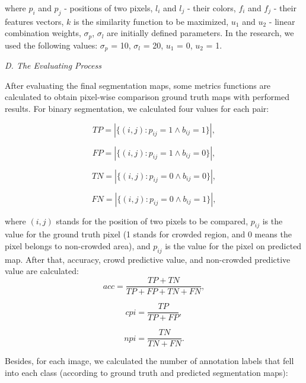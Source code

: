 \documentclass{article}
\begin{document}
\begin{multicols}{2}
where $p_i$ and $p_j$ - positions of two pixels, $l_i$ and $l_j$ - their colors, $f_i$ and $f_j$ - their features vectors, $k$ is the similarity function to be maximized, $u_1$ and $u_2$ - linear combination weights, $\sigma_p$, $\sigma_l$ are initially defined parameters. In the research, we used the following values: $\sigma_p$ = 10, $\sigma_l$ = 20, $u_1$ = 0, $u_2$ = 1.

\par
\vspace{3mm}
\textit {D. The Evaluating Process}
\par
\vspace{2mm}
After evaluating the final segmentation maps, some metrics functions are calculated to obtain pixel-wise comparison ground truth maps with performed results. For binary segmentation, we calculated four values for each pair:

\begin{equation}
    TP = |\{(i, j) : p_{ij} = 1 \wedge b_{ij} = 1\}|,
\end{equation}

\begin{equation}
    FP = |\{(i, j) : p_{ij} = 1 \wedge b_{ij} = 0\}|,
\end{equation}

\begin{equation}
    TN = |\{(i, j) : p_{ij} = 0 \wedge b_{ij} = 0\}|,
\end{equation}

\begin{equation}
    FN = |\{(i, j) : p_{ij} = 0 \wedge b_{ij} = 1\}|,
\end{equation}

where $(i, j)$ stands for the position of two pixels to be compared, $p_{ij}$ is the value for the ground truth pixel (1 stands for crowded region, and 0 means the pixel belongs to non-crowded area), and $p_{ij}$ is the value for the pixel on predicted map. After that, accuracy, crowd predictive value, and non-crowded predictive value are calculated:
\begin{equation}
    acc = \frac{TP + TN}{TP + FP + TN + FN},
\end{equation}

\begin{equation}
    cpi = \frac{TP}{TP + FP},
\end{equation}

\begin{equation}
    npi = \frac{TN}{TN + FN}.
\end{equation}

Besides, for each image, we calculated the number of annotation labels that fell into each class (according to ground truth and predicted segmentation maps):

\end{multicols}
\end{document}
